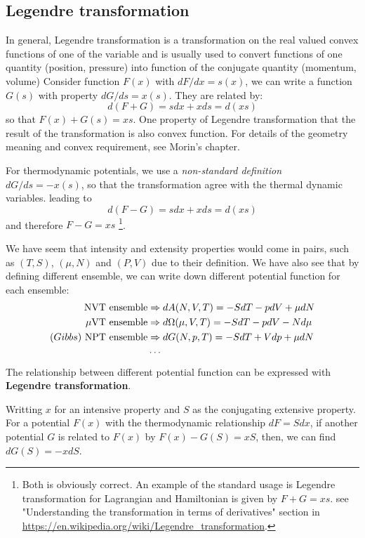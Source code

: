 \documentclass{article}
\begin{document}
\subsection{Legendre transformation}
In general, Legendre transformation is a transformation on the real valued convex functions
of one of the variable and is usually used to convert functions of one quantity (position, pressure) into function of
the conjugate quantity (momentum, volume)
Consider function $F(x)$ with $dF/dx = s(x)$, we can write a function
$G(s)$ with property $dG/ds = x(s)$. They are related by:
\begin{equation}
    d(F+G) = sdx + xds = d(xs)
\end{equation}
so that $F(x) + G(s) = xs$. One property of Legendre transformation that the result of the transformation 
is also convex function. For details of the geometry meaning and convex requirement, see Morin's chapter.

For thermodynamic potentials, we use a \emph{non-standard definition} $dG/ds = -x(s)$, 
so that the transformation agree with the thermal dynamic variables.
leading to 
\begin{equation}
    d(F-G) = sdx + xds = d(xs)
\end{equation}
and therefore $F-G = xs$
\footnote{
    Both is obviously correct. An example of the standard usage is Legendre transformation 
    for Lagrangian and Hamiltonian is given by $F+G = xs$. see "Understanding the transformation in terms of derivatives"
    section in \url{https://en.wikipedia.org/wiki/Legendre_transformation}.
}.

We have seem that intensity and extensity properties would come in pairs, such as $(T,S)$, $(\mu,N)$
and $(P,V)$ due to their definition. We have also see that by defining different ensemble, we can
write down different potential function for each ensemble:
\begin{align}
    \text{NVT ensemble} &\Rightarrow dA(N,V,T) = -SdT - pdV + \mu dN\notag \\
    \text{$\mu$VT ensemble} &\Rightarrow d\Omega(\mu,V,T) = -SdT - pdV - Nd\mu \notag \\
    (Gibbs)\ \text{NPT ensemble} &\Rightarrow dG(N,p,T) = -SdT + Vdp + \mu dN \notag \\
    &\cdots \notag
\end{align}
The relationship between different potential function can be expressed with \textbf{Legendre transformation}.

Writting $x$ for an intensive property and $S$ as the conjugating extensive property. For a potential $F(x)$
with the thermodynamic relationship $dF = Sdx$, if another potential $G$ is related to $F(x)$ by $F(x) - G(S) = xS$,
then, we can find $dG(S) = -xdS$.
\end{document}
